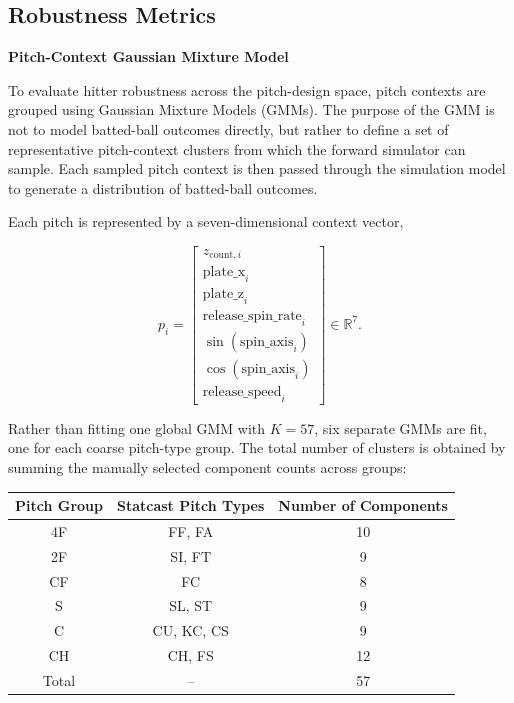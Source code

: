 \documentclass[11pt]{article}
\begin{document}
\subsection{Robustness Metrics}

\textbf{Pitch-Context Gaussian Mixture Model}

To evaluate hitter robustness across the pitch-design space, pitch contexts are grouped using Gaussian Mixture Models (GMMs). The purpose of the GMM is not to model batted-ball outcomes directly, but rather to define a set of representative pitch-context clusters from which the forward simulator can sample. Each sampled pitch context is then passed through the simulation model to generate a distribution of batted-ball outcomes.

Each pitch is represented by a seven-dimensional context vector,

\begin{equation}
    p_i
    =
    \begin{bmatrix}
        z_{\text{count},i} \\
        \text{plate\_x}_i \\
        \text{plate\_z}_i \\
        \text{release\_spin\_rate}_i \\
        \sin(\text{spin\_axis}_i) \\
        \cos(\text{spin\_axis}_i) \\
        \text{release\_speed}_i
    \end{bmatrix}
    \in \mathbb{R}^7 .
\end{equation}

Rather than fitting one global GMM with \(K = 57\), six separate GMMs are fit, one for each coarse pitch-type group. The total number of clusters is obtained by summing the manually selected component counts across groups:

\begin{center}
\begin{tabular}{c c c}
\hline
Pitch Group & Statcast Pitch Types & Number of Components \\
\hline
4F & FF, FA & 10 \\
2F & SI, FT & 9 \\
CF & FC & 8 \\
S  & SL, ST & 9 \\
C  & CU, KC, CS & 9 \\
CH & CH, FS & 12 \\
\hline
Total & -- & 57 \\
\hline
\end{tabular}
\end{center}
\end{document}
